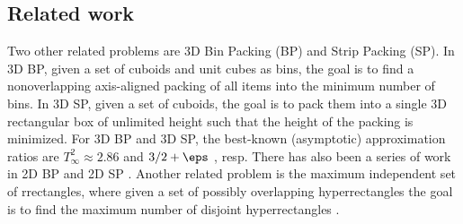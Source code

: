 \subsection{Related work}
Two other related problems are 3D Bin Packing (BP) and Strip Packing (SP). 
In 3D BP, given a set of cuboids and unit cubes as bins, the goal is to find a nonoverlapping axis-aligned packing of all items into the minimum number of bins.
In 3D SP,  given a set of  cuboids, the goal is to pack them into a single 3D rectangular box of unlimited height such that the height of the packing is minimized.
For 3D BP and 3D SP, the best-known (asymptotic) approximation ratios are $T_\infty^{2}\approx 2.86$ \cite{caprara2008packing} and  $3/2+\eps$ \cite{3d-strip-packing}, resp.
There has also been a series of work in 2D BP \cite{BansalCJPS09, bansal2014improved, jansen-pradel-bin-packing, Khan16c} and 
2D SP \cite{harren20145, KenyonR00}.
Another related problem is the maximum independent set of rrectangles, where given a set of possibly overlapping hyperrectangles the goal is to find the maximum number of disjoint hyperrectangles
\cite{AHW19, misr-arxiv, Mitchell21, GalvezKMMPW22, GargK024}.
